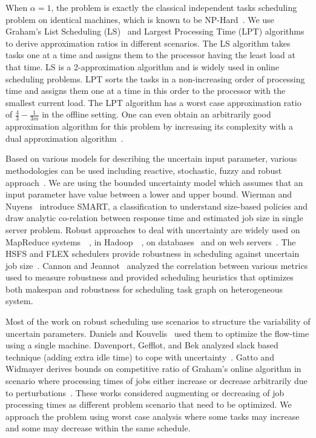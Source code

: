 \documentclass[10pt, conference, compsocconf]{IEEEtran}
\begin{document}
When $\alpha = 1$, the problem is exactly the classical independent
tasks scheduling problem on identical machines, which is known to be
NP-Hard~\cite{GareyJohnson79}. We use Graham's List Scheduling
(LS)~\cite{Graham66} and Largest Processing Time (LPT)
algorithms~\cite{Graham69boundson} to derive approximation ratios in
different scenarios. The LS algorithm takes tasks one at a time and
assigns them to the processor having the least load at that time. LS is a
2-approximation algorithm and is widely used in online scheduling
problems. LPT sorts the tasks in a non-increasing order of processing time and
assigns them one at a time in this order to the processor with the
smallest current load. The LPT algorithm has a worst case approximation
ratio of $\frac{4}{3}-\frac{1}{3m}$ in the offline setting. One can
even obtain an arbitrarily good approximation algorithm for this problem by increasing
its complexity with a dual approximation
algorithm~\cite{Hoch87}.


Based on various models for describing the uncertain input parameter,
various methodologies can be used including reactive, stochastic,
fuzzy and robust approach~\cite{DBLP:journals/cce/LiI08}. We are using
the bounded uncertainty model which assumes that an input parameter
have value between a lower and upper bound.  Wierman and
Nuyens~\cite{conf/sigmetrics/WiermanN08} introduce SMART, a
classification to understand size-based policies and draw analytic
co-relation between response time and estimated job size in single
server problem. Robust approaches to deal with uncertainty are widely
used on MapReduce
systems~\cite{Kavulya:2010:ATP:1844765.1845224}~\cite{Verma:2011:AAR:1998582.1998637},
in
Hadoop~\cite{Wolf:2010:FSA:2023718.2023720}~\cite{White:2009:HDG:1717298},
on databases~\cite{Lipton199518} and on web
servers~\cite{Cardellini99dynamicload}. The HSFS and FLEX schedulers
provide robustness in scheduling against uncertain job
size~\cite{Wolf:2010:FSA:2023718.2023720,6691554}. Cannon and
Jeannot~\cite{cj09c} analyzed the correlation between various metrics
used to measure robustness and provided scheduling heuristics that
optimizes both makespan and robustness for scheduling task graph on
heterogeneous system.

Most of the work on robust scheduling use scenarios to structure
the variability of uncertain parameters. Daniels and
Kouvelis~\cite{citeulike:8334169} used them to optimize the flow-time
using a single machine. Davenport, Gefflot, and Bek analyzed slack
based technique (adding extra idle time) to cope with
uncertainty~\cite{Davenport_slack-basedtechniques}. Gatto and Widmayer
derives bounds on competitive ratio of Graham’s online algorithm in
scenario where processing times of jobs either increase or decrease
arbitrarily due to perturbations~\cite{Gatto07}.  These works
considered augmenting or decreasing of job processing times as
different problem scenario that need to be optimized. We 
approach the problem using worst case analysis where some tasks may
increase and some may decrease within the same schedule.
  
\end{document}

